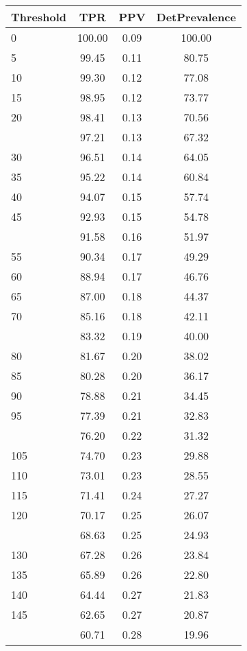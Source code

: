 \begin{table}[ht]
\centering
\begin{tabular}{lccc}
  \toprule
Threshold & TPR & PPV & DetPrevalence \\ 
  \midrule
0 & 100.00 & 0.09 & 100.00 \\ 
  5 & 99.45 & 0.11 & 80.75 \\ 
  10 & 99.30 & 0.12 & 77.08 \\ 
  15 & 98.95 & 0.12 & 73.77 \\ 
  20 & 98.41 & 0.13 & 70.56 \\ 
   \addlinespace
25 & 97.21 & 0.13 & 67.32 \\ 
  30 & 96.51 & 0.14 & 64.05 \\ 
  35 & 95.22 & 0.14 & 60.84 \\ 
  40 & 94.07 & 0.15 & 57.74 \\ 
  45 & 92.93 & 0.15 & 54.78 \\ 
   \addlinespace
50 & 91.58 & 0.16 & 51.97 \\ 
  55 & 90.34 & 0.17 & 49.29 \\ 
  60 & 88.94 & 0.17 & 46.76 \\ 
  65 & 87.00 & 0.18 & 44.37 \\ 
  70 & 85.16 & 0.18 & 42.11 \\ 
   \addlinespace
75 & 83.32 & 0.19 & 40.00 \\ 
  80 & 81.67 & 0.20 & 38.02 \\ 
  85 & 80.28 & 0.20 & 36.17 \\ 
  90 & 78.88 & 0.21 & 34.45 \\ 
  95 & 77.39 & 0.21 & 32.83 \\ 
   \addlinespace
100 & 76.20 & 0.22 & 31.32 \\ 
  105 & 74.70 & 0.23 & 29.88 \\ 
  110 & 73.01 & 0.23 & 28.55 \\ 
  115 & 71.41 & 0.24 & 27.27 \\ 
  120 & 70.17 & 0.25 & 26.07 \\ 
   \addlinespace
125 & 68.63 & 0.25 & 24.93 \\ 
  130 & 67.28 & 0.26 & 23.84 \\ 
  135 & 65.89 & 0.26 & 22.80 \\ 
  140 & 64.44 & 0.27 & 21.83 \\ 
  145 & 62.65 & 0.27 & 20.87 \\ 
   \addlinespace
150 & 60.71 & 0.28 & 19.96 \\ 

\end{tabular}
\end{table}

